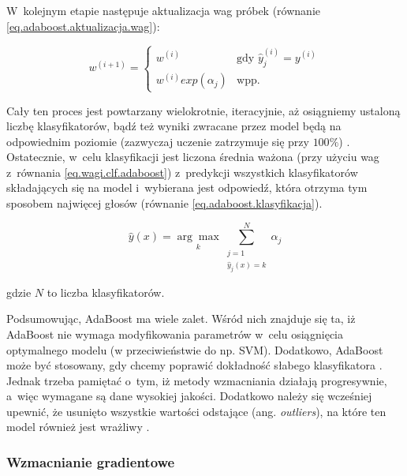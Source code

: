 \noindent W~kolejnym etapie następuje aktualizacja wag próbek (równanie \ref{eq.adaboost.aktualizacja.wag}):

\begin{equation}
\label{eq.adaboost.aktualizacja.wag}
w^{(i+1)} =
\begin{cases}
  w^{(i)} & \text{gdy } \hat {y}_j^{(i)} = y^{(i)}\\
  w^{(i)}exp(\alpha_j) & \text{wpp.}
\end{cases}
\end{equation}

\noindent  Cały ten proces jest powtarzany wielokrotnie, iteracyjnie, aż osiągniemy ustaloną liczbę klasyfikatorów, bądź też wyniki zwracane przez model będą na odpowiednim
poziomie (zazwyczaj uczenie zatrzymuje się przy $100\%$) \cite{Sawka18}. Ostatecznie, w~celu klasyfikacji jest liczona średnia ważona (przy użyciu wag z~równania \ref{eq.wagi.clf.adaboost}) z~predykcji wszystkich klasyfikatorów składających się na model i~wybierana jest odpowiedź, która otrzyma tym sposobem najwięcej głosów (równanie \ref{eq.adaboost.klasyfikacja}).

\begin{equation}
\label{eq.adaboost.klasyfikacja}
\hat y (x) = \underset{k}{\arg\max} \sum_{\substack{j=1 \\ \hat y_j(x)=k}}^N \alpha_j
\end{equation}

\noindent gdzie $N$ to liczba klasyfikatorów. 

Podsumowując, AdaBoost ma wiele zalet. Wśród nich znajduje się ta, iż AdaBoost nie wymaga modyfikowania parametrów w~celu osiągnięcia optymalnego modelu (w przeciwieństwie do np. SVM). Dodatkowo, AdaBoost może być stosowany, gdy chcemy poprawić dokładność słabego klasyfikatora \cite{Kurama20}. Jednak trzeba pamiętać o~tym, iż metody wzmacniania działają progresywnie, a~więc wymagane są dane wysokiej jakości. Dodatkowo należy się wcześniej upewnić, że usunięto wszystkie wartości odstające (ang. \textit{outliers}), na które ten model również jest wrażliwy \cite{Kurama20}. 


\subsubsection{Wzmacnianie gradientowe}
\label{cha:Wzmacnianie gradientowe}

